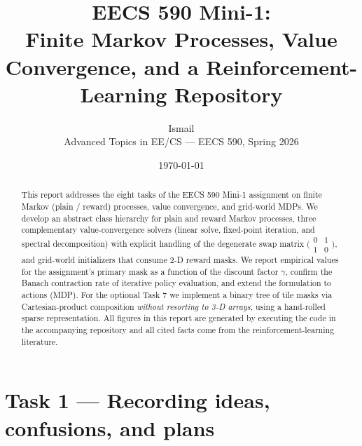\documentclass[11pt]{article}
\title{EECS 590 Mini-1: \\
  Finite Markov Processes, Value Convergence, and a Reinforcement-Learning Repository}
\author{Ismail \\
  Advanced Topics in EE/CS --- EECS 590, Spring 2026}
\date{\today}
\begin{document}
\maketitle

\begin{abstract}
This report addresses the eight tasks of the EECS 590 Mini-1 assignment on
finite Markov (plain / reward) processes, value convergence, and grid-world
MDPs. We develop an abstract class hierarchy for plain and reward Markov
processes, three complementary value-convergence solvers (linear solve,
fixed-point iteration, and spectral decomposition) with explicit handling of
the degenerate swap matrix $\bigl(\begin{smallmatrix}0 & 1\\ 1 &
0\end{smallmatrix}\bigr)$, and grid-world initializers that consume 2-D reward
masks. We report empirical values for the assignment's primary mask as a
function of the discount factor $\gamma$, confirm the Banach contraction rate
of iterative policy evaluation, and extend the formulation to actions
(MDP). For the optional Task 7 we implement a binary tree of tile masks via
Cartesian-product composition \emph{without resorting to 3-D arrays}, using a
hand-rolled sparse representation. All figures in this report are generated
by executing the code in the accompanying repository and all cited facts
come from the reinforcement-learning literature.
\end{abstract}

\section{Task 1 --- Recording ideas, confusions, and plans}
\end{document}

